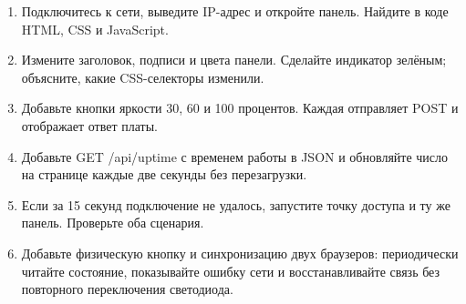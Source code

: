 \begin{tasks}
\begin{enumerate}
\item {} Подключитесь к сети, выведите IP-адрес и откройте панель. Найдите в коде HTML, CSS и JavaScript.
\item {} Измените заголовок, подписи и цвета панели. Сделайте индикатор зелёным; объясните, какие CSS-селекторы изменили.
\item {} Добавьте кнопки яркости 30, 60 и 100 процентов. Каждая отправляет POST и отображает ответ платы.
\item {} Добавьте GET /api/uptime с временем работы в JSON и обновляйте число на странице каждые две секунды без перезагрузки.
\item {} Если за 15 секунд подключение не удалось, запустите точку доступа и ту же панель. Проверьте оба сценария.
\item {} Добавьте физическую кнопку и синхронизацию двух браузеров: периодически читайте состояние, показывайте ошибку сети и восстанавливайте связь без повторного переключения светодиода.
\end{enumerate}
\end{tasks}
